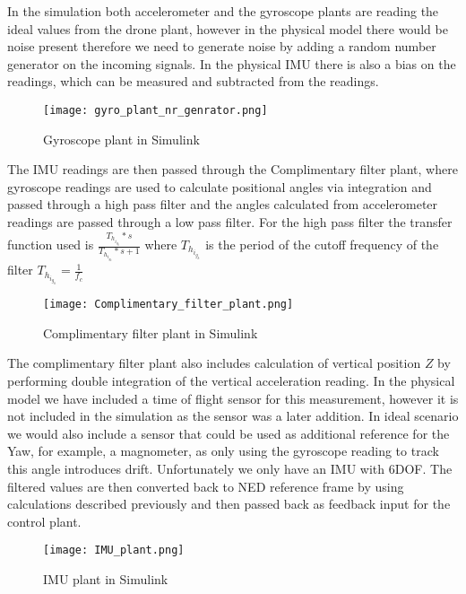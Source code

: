 \documentclass{article}
\begin{document}
\begin{flushleft}
In the simulation both accelerometer and the gyroscope plants are reading the ideal values from the drone plant, however in the physical model there would be noise present therefore we need to generate noise by adding a random number generator on the incoming signals. In the physical IMU there is also a bias on the readings, which can be measured and subtracted from the readings.

\begin{figure}[H]
    \begin{center}
    \texttt{[image: gyro\_plant\_nr\_genrator.png]}
    \end{center}
    \caption{Gyroscope plant in Simulink}
    \label{fig:my_label}
\end{figure}

The IMU readings are then passed through the Complimentary filter plant, where gyroscope readings are used to calculate positional angles via integration and passed through a high pass filter and the angles calculated from accelerometer readings are passed through a low pass filter. For the high pass filter the transfer function used is $\frac{T_h_i_g_h*s}{T_h_i_g_h*s+1}$ where $T_h_i_g_h$ is the period of the cutoff frequency of the filter $T_h_i_g_h=\frac{1}{f_c}$


\begin{figure}[H]
    \begin{center}
    \texttt{[image: Complimentary\_filter\_plant.png]}
    \end{center}
    \caption{Complimentary filter plant in Simulink}
    \label{fig:my_label}
\end{figure}

The complimentary filter plant also includes calculation of vertical position $Z$ by performing double integration of the vertical acceleration reading. In the physical model we have included a time of flight sensor for this measurement, however it is not included in the simulation as the sensor was a later addition. In ideal scenario we would also include a sensor that could be used as additional reference for the Yaw, for example, a magnometer, as only using the gyroscope reading to track this angle introduces drift. Unfortunately we only have an IMU with 6DOF. 
The filtered values are then converted back to NED reference frame by using calculations described previously and then passed back as feedback input for the control plant.

\begin{figure}[H]
    \begin{center}
    \texttt{[image: IMU\_plant.png]}
    \end{center}
    \caption{IMU plant in Simulink}
    \label{fig:my_label}
\end{figure}

\end{flushleft}
\end{document}

